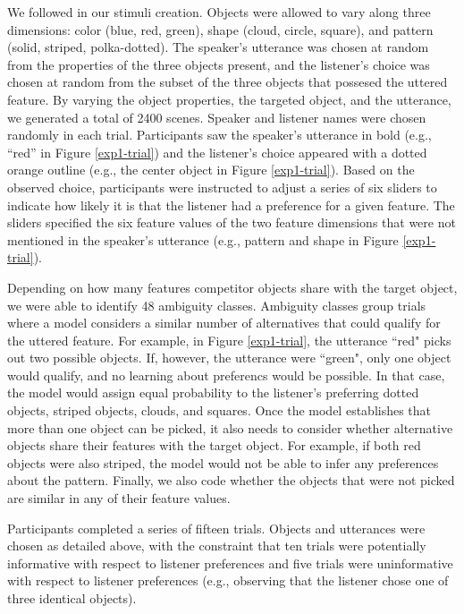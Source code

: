 \documentclass[10pt,a4paper]{article}
\begin{document}
We followed  in our stimuli creation. Objects were allowed to vary along three dimensions: color (blue, red, green), shape (cloud, circle, square), and pattern (solid, striped, polka-dotted). The speaker's utterance was chosen at random from the properties of the three objects present, and the listener's choice was chosen at random from the subset of the three objects that possesed the uttered feature. By varying the object properties, the targeted object, and the utterance, we generated a total of 2400 scenes. Speaker and listener names were chosen randomly in each trial. Participants saw the speaker's utterance in bold (e.g., ``red'' in Figure \ref{exp1-trial}) and the listener's choice appeared with a dotted orange outline (e.g., the center object in Figure \ref{exp1-trial}). Based on the observed choice, participants were instructed to adjust a series of six sliders to indicate how likely it is that the listener had a preference for a given feature. The sliders specified the six feature values of the two feature dimensions that were not mentioned in the speaker's utterance (e.g., pattern and shape in Figure \ref{exp1-trial}). 

Depending on how many features competitor objects share with the target object, we were able to identify 48 ambiguity classes. Ambiguity classes group trials where a model considers a similar number of alternatives that could qualify for the uttered feature. For example, in Figure \ref{exp1-trial}, the utterance ``red" picks out two possible objects. If, however, the utterance were ``green", only one object would qualify, and no learning about preferencs would be possible. In that case, the model would assign equal probability to the listener's preferring dotted objects, striped objects, clouds, and squares. Once the model establishes that more than one object can be picked, it also needs to consider whether alternative objects share their features with the target object. For example, if both red objects were also striped, the model would not be able to infer any preferences about the pattern. Finally, we also code whether the objects that were not picked are similar in any of their feature values.

Participants completed a series of fifteen trials. Objects and utterances were chosen as detailed above, with the constraint that ten trials were potentially informative with respect to listener preferences and five trials were uninformative with respect to listener preferences (e.g., observing that the listener chose one of three identical objects). 
\end{document}
